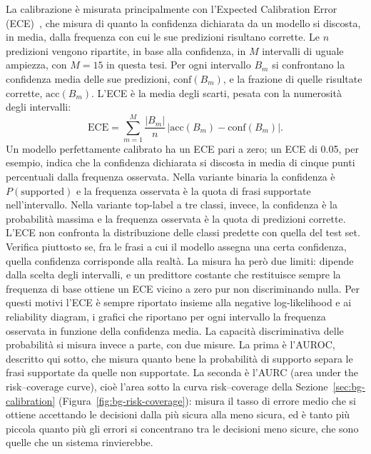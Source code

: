 La calibrazione è misurata principalmente con l'Expected Calibration Error
(ECE)~\cite{naeini2015ece,guo2017calibration}, che misura di quanto la confidenza dichiarata da un modello si discosta,
in media, dalla frequenza con cui le sue predizioni risultano corrette. Le $n$ predizioni vengono ripartite, in base
alla confidenza, in $M$ intervalli di uguale ampiezza, con $M = 15$ in questa tesi. Per ogni intervallo $B_m$ si
confrontano la confidenza media delle sue predizioni, $\mathrm{conf}(B_m)$, e la frazione di quelle risultate
corrette, $\mathrm{acc}(B_m)$. L'ECE è la media degli scarti, pesata con la numerosità degli intervalli:
\begin{equation}
  \mathrm{ECE} = \sum_{m=1}^{M} \frac{|B_m|}{n} \, \bigl| \mathrm{acc}(B_m) - \mathrm{conf}(B_m) \bigr| .
  \label{eq:ece}
\end{equation}
Un modello perfettamente calibrato ha un ECE pari a zero; un ECE di 0.05, per esempio, indica che la confidenza
dichiarata si discosta in media di cinque punti percentuali dalla frequenza osservata. Nella variante binaria la confidenza è $P(\text{supported})$ e la
frequenza osservata è la quota di frasi supportate nell'intervallo. Nella variante top-label a tre classi, invece, la
confidenza è la probabilità massima e la frequenza osservata è la quota di predizioni corrette. L'ECE non confronta la
distribuzione delle classi predette con quella del test set. Verifica piuttosto se, fra le frasi a cui il modello
assegna una certa confidenza, quella confidenza corrisponde alla realtà. La misura ha però due limiti: dipende dalla
scelta degli intervalli, e un predittore costante che restituisce sempre la frequenza di base ottiene un ECE vicino a
zero pur non discriminando nulla. Per questi motivi l'ECE è sempre riportato insieme alla negative log-likelihood e ai reliability diagram, i grafici che riportano per ogni intervallo la frequenza osservata in funzione della confidenza
media. La capacità discriminativa delle probabilità si misura invece a parte, con due misure. La prima è l'AUROC, descritto qui sotto, che misura quanto bene la probabilità di supporto separa le frasi supportate da quelle non supportate. La seconda è l'AURC (area under the risk--coverage curve), cioè l'area
sotto la curva risk--coverage della Sezione~\ref{sec:bg-calibration} (Figura~\ref{fig:bg-risk-coverage}): misura il
tasso di errore medio che si ottiene accettando le decisioni dalla più sicura alla meno sicura, ed è tanto più piccola
quanto più gli errori si concentrano tra le decisioni meno sicure, che sono quelle che un sistema rinvierebbe.

